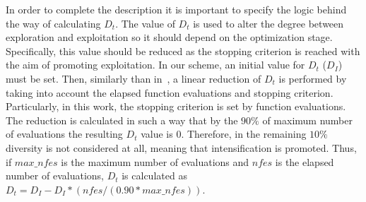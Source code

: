 In order to complete the description it is important to specify the logic behind the way of calculating $D_t$. 
%
The value of $D_t$ is used to alter the degree between exploration and exploitation so it should depend on the optimization stage.
%
Specifically, this value should be reduced as the stopping criterion is reached with the aim of promoting exploitation.
%
In our scheme, an initial value for $D_t$ ($D_I$) must be set.
%
Then, similarly than in~\cite{segura2016novel}, a linear reduction of $D_t$ is performed by taking into account the elapsed function evaluations and stopping criterion.
%
Particularly, in this work, the stopping criterion is set by function evaluations.
%
The reduction is calculated in such a way that by the $90\%$ of maximum number of evaluations the resulting $D_t$ value is $0$.
%
Therefore, in the remaining $10\%$ diversity is not considered at all, meaning that intensification is promoted.
%
Thus, if $max\_nfes$ is the maximum number of evaluations and $nfes$ is the elapsed number of evaluations, $D_t$ is calculated as $D_t=D_I - D_I *(nfes/(0.90*max\_nfes))$.
%
%

%


